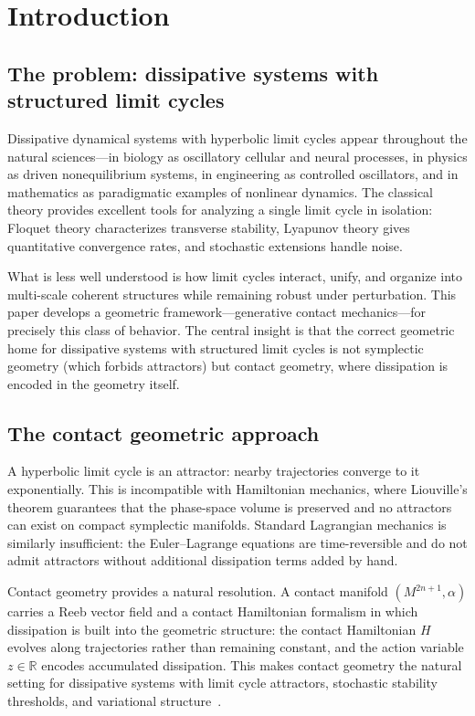 \documentclass[12pt, oneside]{book}
\theoremstyle{plain}
\theoremstyle{definition}
\theoremstyle{remark}
\newcommand{\R}{\mathbb{R}}
\begin{document}
\section{Introduction}\label{sec:intro}

\subsection{The problem: dissipative systems with structured limit cycles}

Dissipative dynamical systems with hyperbolic limit cycles appear throughout
the natural sciences---in biology as oscillatory cellular and neural
processes, in physics as driven nonequilibrium systems, in engineering as
controlled oscillators, and in mathematics as paradigmatic examples of
nonlinear dynamics. The classical theory provides excellent tools for
analyzing a single limit cycle in isolation: Floquet theory characterizes
transverse stability, Lyapunov theory gives quantitative convergence rates,
and stochastic extensions handle noise.

What is less well understood is how limit cycles interact, unify, and
organize into multi-scale coherent structures while remaining robust under
perturbation. This paper develops a geometric framework---generative contact
mechanics---for precisely this class of behavior. The central insight is
that the correct geometric home for dissipative systems with structured limit
cycles is not symplectic geometry (which forbids attractors) but contact
geometry, where dissipation is encoded in the geometry itself.

\subsection{The contact geometric approach}

A hyperbolic limit cycle is an attractor: nearby trajectories converge to it
exponentially. This is incompatible with Hamiltonian mechanics, where
Liouville's theorem guarantees that the phase-space volume is preserved and
no attractors can exist on compact symplectic manifolds. Standard Lagrangian
mechanics is similarly insufficient: the Euler--Lagrange equations are
time-reversible and do not admit attractors without additional dissipation
terms added by hand.

Contact geometry provides a natural resolution. A contact manifold
$(M^{2n+1},\alpha)$ carries a Reeb vector field and a contact Hamiltonian
formalism in which dissipation is built into the geometric structure: the
contact Hamiltonian $H$ evolves along trajectories rather than remaining
constant, and the action variable $z\in\R$ encodes accumulated dissipation.
This makes contact geometry the natural setting for dissipative systems
with limit cycle attractors, stochastic stability thresholds, and
variational structure~\cite{Bravetti2017,deLeonLainz2019}.
\end{document}
